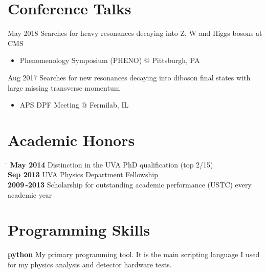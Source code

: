\documentclass[14pt]{article} %
\begin{document}
\section{Conference Talks}
\job
{May 2018}{}
{Searches for heavy resonances decaying into Z, W and Higgs bosons at CMS}
{\begin{itemize}
\item Phenomenology Symposium (PHENO) @ Pittsburgh, PA
\end{itemize}
}
\job
{Aug 2017}{}
{Searches for new resonances decaying into diboson final states with large missing transverse momentum}
{\begin{itemize}
\item APS DPF Meeting @ Fermilab, IL
\end{itemize}
}

\section{Academic Honors}
\begin{tabbing} %
\hspace{2cm} \= \kill
\textbf{May 2014} \> Distinction in the UVA PhD qualification (top 2/15) \\
\textbf{Sep 2013} \> UVA Physics Department Fellowship \\
\textbf{2009\,-2013} \> Scholarship for outstanding academic performance (USTC) every academic year\\
\end{tabbing}

\section{Programming Skills}
\textbf{python}
\small{
My primary programming tool. It is the main scripting language I used for my physics analysis and detector hardware tests.
}\\
\end{document}
